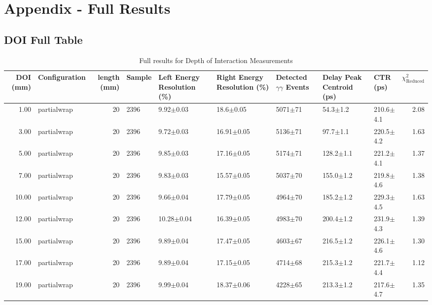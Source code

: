 \section*{Appendix - Full Results}

\subsection{DOI Full Table}
\begin{table}
\caption{\label{tab:FullDOIResults} Full results for Depth of Interaction Measurements}
\begin{tabular}{rlrllllllr}
\hline
DOI (mm) & Configuration &  length (mm) & Sample & Left Energy Resolution (\%) & Right Energy Resolution (\%) & Detected $\gamma\gamma$ Events & Delay Peak Centroid (ps) & CTR (ps) &  $\chi^2_\text{Reduced}$ \\
\hline
      1.00 &   partialwrap &      20 &    2396 &        9.92$\pm$0.03 &    18.6$\pm$0.05 &  5071$\pm$71 &    54.3$\pm$1.2 &   210.6$\pm$4.1 &        2.08 \\
      3.00 &   partialwrap &      20 &    2396 &        9.72$\pm$0.03 &   16.91$\pm$0.05 &  5136$\pm$71 &    97.7$\pm$1.1 &   220.5$\pm$4.2 &        1.63 \\
      5.00 &   partialwrap &      20 &    2396 &        9.85$\pm$0.03 &   17.16$\pm$0.05 &  5174$\pm$71 &   128.2$\pm$1.1 &   221.2$\pm$4.1 &        1.37 \\
      7.00 &   partialwrap &      20 &    2396 &        9.83$\pm$0.03 &   15.57$\pm$0.05 &  5037$\pm$70 &   155.0$\pm$1.2 &   219.8$\pm$4.6 &        1.38 \\
     10.00 &   partialwrap &      20 &    2396 &        9.66$\pm$0.04 &   17.79$\pm$0.05 &  4964$\pm$70 &   185.2$\pm$1.2 &   229.3$\pm$4.5 &        1.63 \\
     12.00 &   partialwrap &      20 &    2396 &       10.28$\pm$0.04 &   16.39$\pm$0.05 &  4983$\pm$70 &   200.4$\pm$1.2 &   231.9$\pm$4.3 &        1.39 \\
     15.00 &   partialwrap &      20 &    2396 &        9.89$\pm$0.04 &   17.47$\pm$0.05 &  4603$\pm$67 &   216.5$\pm$1.2 &   226.1$\pm$4.6 &        1.30 \\
     17.00 &   partialwrap &      20 &    2396 &        9.89$\pm$0.04 &   17.15$\pm$0.05 &  4714$\pm$68 &   215.3$\pm$1.2 &   221.7$\pm$4.4 &        1.12 \\
     19.00 &   partialwrap &      20 &    2396 &        9.99$\pm$0.04 &   18.37$\pm$0.06 &  4228$\pm$65 &   213.3$\pm$1.2 &   217.6$\pm$4.7 &        1.35 \\

\end{tabular}
\end{table}
